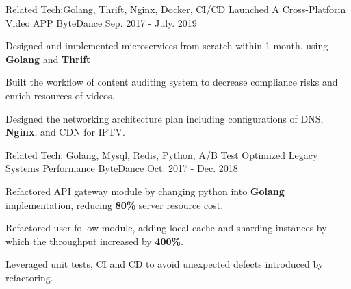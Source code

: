 \begin{cventries}

  \cventrynew
    {Related Tech:Golang, Thrift, Nginx, Docker, CI/CD} %
    {Launched A Cross-Platform Video APP} %
    {ByteDance} %
    {Sep. 2017 - July. 2019}
    {
      \begin{cvitems} 
        \item {Designed and implemented microservices from scratch within 1 month, using \textbf{Golang} and \textbf{Thrift}} %
        \item {Built the workflow of content auditing system to decrease compliance risks and enrich resources of videos.}
        \item {Designed the networking architecture plan including configurations of DNS, \textbf{Nginx}, and CDN for IPTV. } %
      \end{cvitems}
    }
  \cventrynew
    {Related Tech: Golang, Mysql, Redis, Python, A/B Test} %
    {Optimized Legacy Systems Performance} %
    {ByteDance} %
    {Oct. 2017 - Dec. 2018} %
    {
      \begin{cvitems} 
        \item {Refactored API gateway module by changing python into \textbf{Golang} implementation, reducing \textbf{80\%} server resource cost.}
        \item {Refactored user follow module, adding local cache and sharding instances by which the throughput increased by \textbf{400\%}.}
        \item {Leveraged unit tests, CI and CD to avoid unexpected defects introduced by refactoring.}
      \end{cvitems}
    }



\end{cventries}
